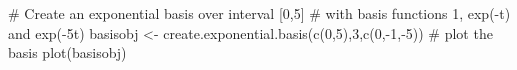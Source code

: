 \begin{Examples}
\begin{ExampleCode}

#  Create an exponential basis over interval [0,5]
#  with basis functions 1, exp(-t) and exp(-5t)
basisobj <- create.exponential.basis(c(0,5),3,c(0,-1,-5))
#  plot the basis
plot(basisobj)

\end{ExampleCode}
\end{Examples}

